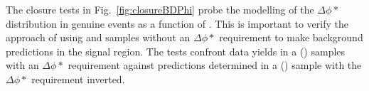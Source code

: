 
The closure tests in Fig.~\ref{fig:closureBDPhi} probe the modelling
of the $\Delta\phi *$ distribution in genuine \met events as a
function of \scalht. This is important to verify the approach of using
\mj and \mmj samples without an $\Delta\phi *$ requirement to make
background predictions in the signal region. The tests confront data
yields in a \mj (\mmj) samples with an $\Delta\phi *$ requirement
against predictions determined in a \mj (\mmj) sample with the
$\Delta\phi *$ requirement inverted. 

